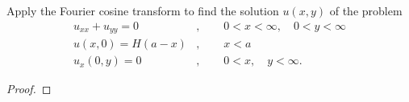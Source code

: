 \begin{problem}{2.20}
  Apply the Fourier cosine transform to find the solution $u(x, y)$ of the problem
  \begin{align*}
    u_{xx} + u_{yy} = 0 &, \qquad 0 < x < \infty, \quad 0 < y < \infty \\
    u(x, 0) = H(a-x) &, \qquad x < a \\
    u_x(0, y) = 0 &, \qquad 0 < x, \quad y < \infty.
  \end{align*}
\end{problem}

\begin{proof}
\end{proof}
\newpage
